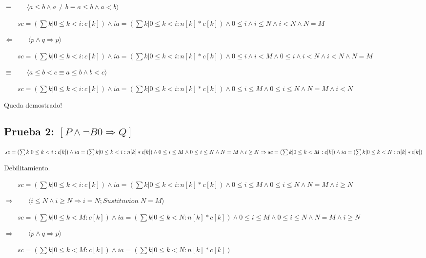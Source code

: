 \documentclass{article}
\begin{document}
$\equiv  \qquad \langle a \leq b \land a \neq b \equiv a \leq b \land a < b \rangle$ \par 
$\qquad sc=(\sum k|0 \leq k < i: c[k]) \land ia=(\sum k|0 \leq k < i: n[k]*c[k]) \land 0 \leq i \land i \leq N \land i < N  \land N=M$ \par 
$\Leftarrow  \qquad \langle p \land q \Rightarrow p \rangle$ \par 
$\qquad sc=(\sum k|0 \leq k < i: c[k]) \land ia=(\sum k|0 \leq k < i: n[k]*c[k]) \land 0 \leq i \land i < M \land 0 \leq i \land i < N \land i < N  \land N=M$ \par 
$\equiv  \qquad \langle a \leq b <c \equiv a \leq b \land b < c \rangle$ \par 
$\qquad sc=(\sum k|0 \leq k < i: c[k]) \land ia=(\sum k|0 \leq k < i: n[k]*c[k]) \land 0 \leq i \leq M \land 0 \leq i \leq N \land N=M \land i < N$ \par 

Queda demostrado! \par 

\newpage

\subsection*{Prueba 2: $[P \land \neg B0 \Rightarrow Q]$}

$sc=(\sum k|0 \leq k < i: c[k]) \land ia=(\sum k|0 \leq k < i: n[k]*c[k]) \land 0 \leq i \leq M \land 0 \leq i \leq N \land N=M \land i \geq N \Rightarrow \\
sc=(\sum k|0 \leq k < M: c[k]) \land ia=(\sum k|0 \leq k < N: n[k]*c[k]) $ \par  


Debilitamiento. \par 
$\qquad sc=(\sum k|0 \leq k < i: c[k]) \land ia=(\sum k|0 \leq k < i: n[k]*c[k]) \land 0 \leq i \leq M \land 0 \leq i \leq N \land N=M \land i \geq N$\par 
$\Rightarrow  \qquad \langle i \leq N \land i \geq N \Rightarrow i = N; Sustituvion \; N=M \rangle$ \par 
$\qquad sc=(\sum k|0 \leq k < M: c[k]) \land ia=(\sum k|0 \leq k < N: n[k]*c[k]) \land 0 \leq i \leq M \land 0 \leq i \leq N \land N=M \land i \geq N$\par 
$\Rightarrow  \qquad \langle p \land q \Rightarrow p \rangle$ \par 
$\qquad sc=(\sum k|0 \leq k < M: c[k]) \land ia=(\sum k|0 \leq k < N: n[k]*c[k])$\par 
\end{document}
